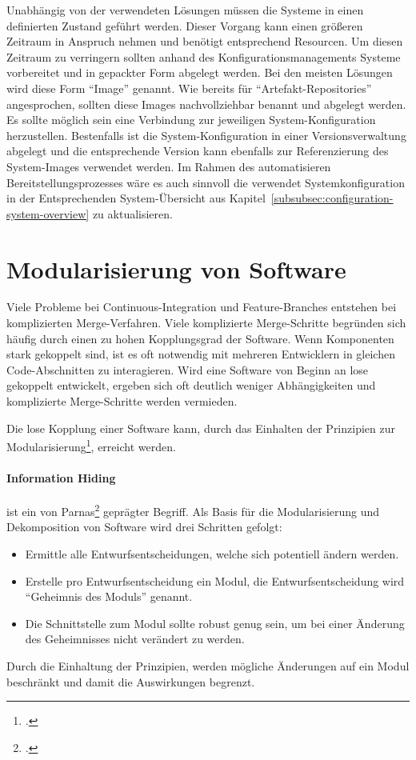 Unabhängig von der verwendeten Lösungen müssen die Systeme in einen definierten Zustand geführt werden. Dieser Vorgang kann einen größeren Zeitraum in Anspruch nehmen und benötigt entsprechend Resourcen. Um diesen Zeitraum zu verringern sollten anhand des Konfigurationsmanagements Systeme vorbereitet und in gepackter Form abgelegt werden. Bei den meisten Lösungen wird diese Form ``Image'' genannt. Wie bereits für ``Artefakt-Repositories'' angesprochen, sollten diese Images nachvollziehbar benannt und abgelegt werden. Es sollte möglich sein eine Verbindung zur jeweiligen System-Konfiguration herzustellen. Bestenfalls ist die System-Konfiguration in einer Versionsverwaltung abgelegt und die entsprechende Version kann ebenfalls zur Referenzierung des System-Images verwendet werden. Im Rahmen des automatisieren Bereitstellungsprozesses wäre es auch sinnvoll die verwendet Systemkonfiguration in der Entsprechenden System-Übersicht aus Kapitel~\ref{subsubsec:configuration-system-overview} zu aktualisieren.

\section{Modularisierung von Software}

Viele Probleme bei Continuous-Integration und Feature-Branches entstehen bei komplizierten Merge-Verfahren. Viele komplizierte Merge-Schritte begründen sich häufig durch einen zu hohen Kopplungsgrad der Software. Wenn Komponenten stark gekoppelt sind, ist es oft notwendig mit mehreren Entwicklern in gleichen Code-Abschnitten zu interagieren. Wird eine Software von Beginn an lose gekoppelt entwickelt, ergeben sich oft deutlich weniger Abhängigkeiten und komplizierte Merge-Schritte werden vermieden.

Die lose Kopplung einer Software kann, durch das Einhalten der Prinzipien zur Modularisierung\footcite{2012-barth-modularisation}, erreicht werden. 

\paragraph{Information Hiding} ist ein von Parnas\footcite{1972-parnas} geprägter Begriff. Als Basis für die Modularisierung und Dekomposition von Software wird drei Schritten gefolgt:
\begin{itemize}
\item Ermittle alle Entwurfsentscheidungen, welche sich potentiell ändern werden.
\item Erstelle pro Entwurfsentscheidung ein Modul, die Entwurfsentscheidung wird ``Geheimnis des Moduls'' genannt.
\item Die Schnittstelle zum Modul sollte robust genug sein, um bei einer Änderung des Geheimnisses nicht verändert zu werden.
\end{itemize}
Durch die Einhaltung der Prinzipien, werden mögliche Änderungen auf ein Modul beschränkt und damit die Auswirkungen begrenzt.
